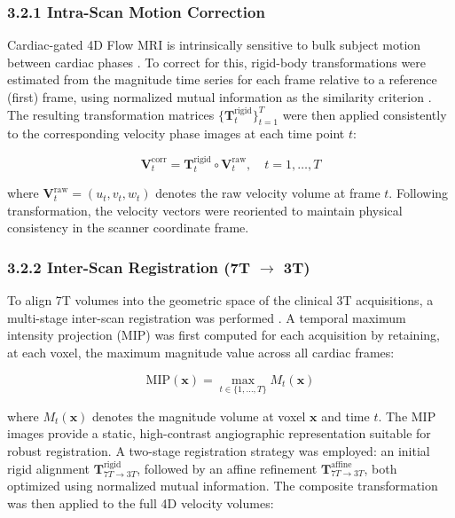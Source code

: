 \documentclass[11pt]{article}
\begin{document}
\subsubsection*{3.2.1 Intra-Scan Motion Correction}

Cardiac-gated 4D Flow MRI is intrinsically sensitive to bulk subject motion between cardiac phases \cite{stehning2020}. To correct for this, rigid-body transformations were estimated from the magnitude time series for each frame relative to a reference (first) frame, using normalized mutual information as the similarity criterion \cite{maes1997}. The resulting transformation matrices $\{\mathbf{T}_t^{\text{rigid}}\}_{t=1}^{T}$ were then applied consistently to the corresponding velocity phase images at each time point $t$:

\begin{equation}
    \mathbf{V}_t^{\text{corr}} = \mathbf{T}_t^{\text{rigid}} \circ \mathbf{V}_t^{\text{raw}}, \quad t = 1, \ldots, T
\end{equation}

where $\mathbf{V}_t^{\text{raw}} = (u_t, v_t, w_t)$ denotes the raw velocity volume at frame $t$. Following transformation, the velocity vectors were reoriented to maintain physical consistency in the scanner coordinate frame.

\subsubsection*{3.2.2 Inter-Scan Registration (7T $\rightarrow$ 3T)}

To align 7T volumes into the geometric space of the clinical 3T acquisitions, a multi-stage inter-scan registration was performed \cite{qu2020synth7t,cui2024synth7t}. A temporal maximum intensity projection (MIP) was first computed for each acquisition by retaining, at each voxel, the maximum magnitude value across all cardiac frames:

\begin{equation}
    \text{MIP}(\mathbf{x}) = \max_{t \in \{1,\ldots,T\}} M_t(\mathbf{x})
\end{equation}

where $M_t(\mathbf{x})$ denotes the magnitude volume at voxel $\mathbf{x}$ and time $t$. The MIP images provide a static, high-contrast angiographic representation suitable for robust registration. A two-stage registration strategy was employed: an initial rigid alignment $\mathbf{T}^{\text{rigid}}_{7T \to 3T}$, followed by an affine refinement $\mathbf{T}^{\text{affine}}_{7T \to 3T}$, both optimized using normalized mutual information. The composite transformation was then applied to the full 4D velocity volumes:
\end{document}
